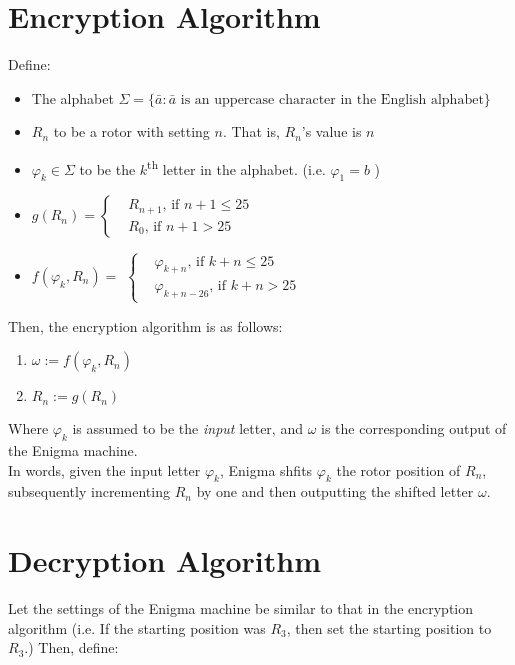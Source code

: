 \documentclass[12pt,a4paper]{article}
\begin{document}
	\section{Encryption Algorithm}
	Define:
		\begin{itemize}
			\item The alphabet $\Sigma = \{\bar{a}: \bar{a} \text{ is an uppercase character in the English alphabet} \}$
			\item $R_n$ to be a rotor with setting $n$. That is, $R_n$'s value is $n$
			\item $\varphi_k \in \Sigma$ to be the $k$\textsuperscript{th} letter in the alphabet. (i.e. $\varphi_1 = b$ )

			\item $g(R_n) = \begin{cases}
					& R_{n+1} \text{, if } {n+1} \leq 25 \\
				      & R_0 \text{, if }{n+1} > 25
				  \end{cases} $
   
			
			\item $f(\varphi_k, R_n) =$ 
					$ 
					\begin{cases} 
						&\varphi_{k+n} \text{, if } {k+n} \leq 25 \\
						&\varphi_{k+n-26} \text{, if }{k+n} > 25
					\end{cases}
					$ 
		\end{itemize}
	

	Then, the encryption algorithm is as follows:
	
	\begin{enumerate}
		\item $\omega := f(\varphi_k, R_n)$
		\item $R_n := g(R_n)$
	\end{enumerate}

	Where $\varphi_k$ is assumed to be the \emph{input} letter, and $\omega$ is the corresponding output of the Enigma machine. \\
	
	In words, given the input letter $\varphi_k$, Enigma shfits $\varphi_k$ the rotor position of $R_n$, subsequently incrementing $R_n$ by one and then outputting the shifted letter $\omega$.

	\section{Decryption Algorithm}

	\newcommand{\fhat}{\hat{f}}
	Let the settings of the Enigma machine be similar to that in the encryption algorithm (i.e. If the starting position was $R_3$, then set the starting position to $R_3$.) Then, define:
\end{document}
